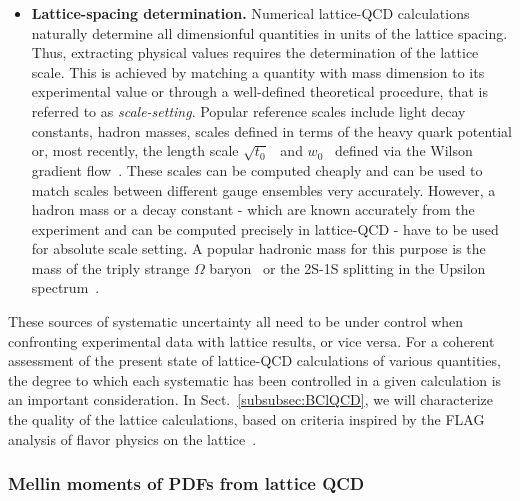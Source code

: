 \begin{itemize}
\item {\bfseries Lattice-spacing determination.} 
Numerical lattice-QCD calculations naturally determine all dimensionful 
quantities in units of the lattice spacing. 
%
Thus, extracting physical values requires the determination of the lattice 
scale. 
%
This is achieved by matching a quantity with mass dimension to its experimental 
value or through a well-defined theoretical procedure, that is referred to as
{\it scale-setting}. 
%
Popular reference scales include light decay constants, hadron masses, 
scales defined in terms of the heavy quark potential or, most recently, 
the length scale $\sqrt{t_0}$~\cite{Luscher:2010iy} and 
$w_0$~\cite{Borsanyi:2012zs} defined via the Wilson  gradient 
flow~\cite{Luscher:2010iy}. 
%
These scales can be computed cheaply and can be used to 
match scales between different gauge ensembles very accurately.  
%
However, a hadron mass or a decay constant - which are known accurately 
from the experiment and can be computed precisely in lattice-QCD  - 
have to be used for absolute scale setting. 
%
A popular hadronic mass for this purpose is the mass of the triply strange 
$\Omega$ baryon~\cite{Durr:2008zz} or the 2S-1S splitting in the Upsilon 
spectrum~\cite{Kendall:2008zz}.

\end{itemize}

These sources of systematic uncertainty all need to be under control
when confronting experimental data with lattice results, or vice
versa.
%
For a coherent assessment of the present state of lattice-QCD
calculations of various quantities, the degree to which each
systematic has been controlled in a given calculation is an important
consideration.
%
In Sect.~\ref{subsubsec:BClQCD}, we will characterize the
quality of the lattice calculations, based on criteria inspired by the
FLAG analysis of flavor physics on the lattice~\cite{Aoki:2016frl}.

\subsubsection{Mellin moments of PDFs from lattice QCD}
\label{Sec:MomentsLQCD}

